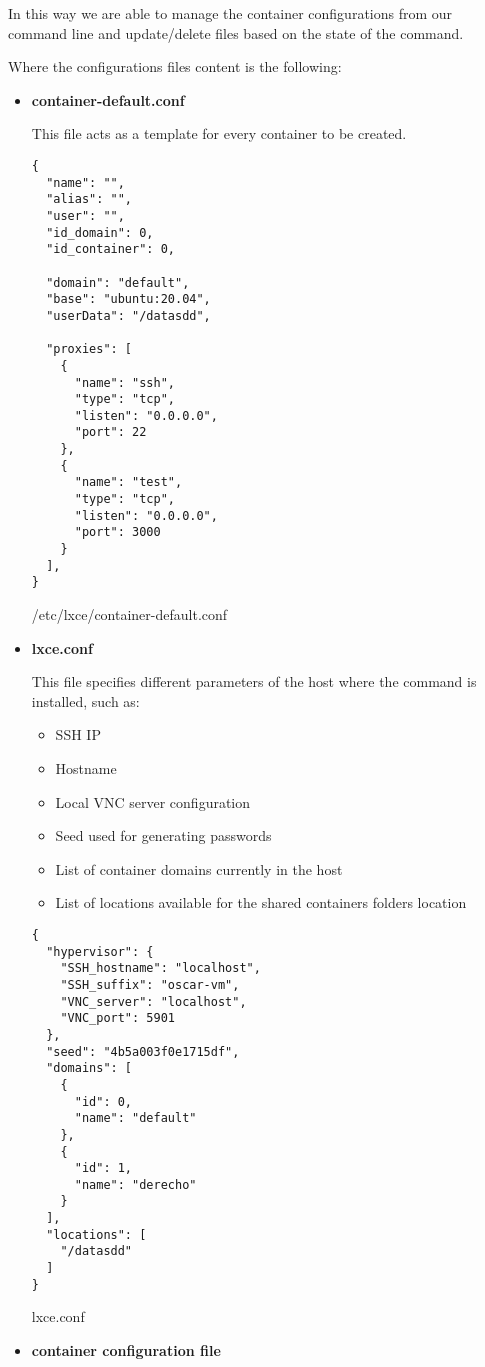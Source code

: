 In this way we are able to manage the container configurations from our command line and update/delete files based on the state of the command.

Where the configurations files content is the following:
\begin{itemize}
\newpage
\item{\textbf{container-default.conf}

This file acts as a template for every container to be created.
\begin{listing}[H]
\begin{verbatim}
{
  "name": "",                           
  "alias": "",                          
  "user": "",
  "id_domain": 0,
  "id_container": 0,

  "domain": "default",                 
  "base": "ubuntu:20.04",             
  "userData": "/datasdd",            

  "proxies": [                      
    {
      "name": "ssh",
      "type": "tcp",
      "listen": "0.0.0.0",
      "port": 22
    },
    {
      "name": "test",
      "type": "tcp",
      "listen": "0.0.0.0",
      "port": 3000
    }
  ],
}
\end{verbatim}
\caption{/etc/lxce/container-default.conf}
\label{listings: /etc/lxce/container-default.conf}
\end{listing}
}
\newpage
\item{\textbf{lxce.conf}

This file specifies different parameters of the host where the command is installed, such as:
\begin{itemize}
	\item{SSH IP}
	\item{Hostname}
	\item{Local VNC server configuration}
	\item{Seed used for generating passwords}
	\item{List of container domains currently in the host}
	\item{List of locations available for the shared containers folders location}
\end{itemize}
\begin{listing}[H]
\begin{verbatim}
{
  "hypervisor": {
    "SSH_hostname": "localhost",
    "SSH_suffix": "oscar-vm",
    "VNC_server": "localhost",
    "VNC_port": 5901
  },
  "seed": "4b5a003f0e1715df",
  "domains": [
    {
      "id": 0,
      "name": "default"
    },
    {
      "id": 1,
      "name": "derecho"
    }
  ],
  "locations": [
    "/datasdd"
  ]
}
\end{verbatim}
\caption{lxce.conf}
\label{listings: /etc/lxce/lxce.conf}
\end{listing}
}
\newpage
\item{\textbf{container configuration file}

}
\end{itemize}
